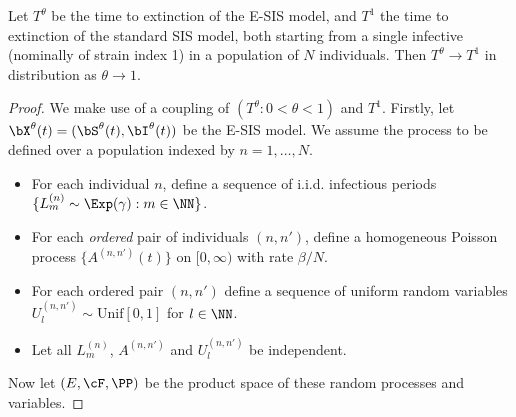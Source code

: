 \documentclass[review]{elsarticle}
\begin{document}
\begin{mythm}\label{thm: tt 1}
	Let $T^{\theta}$ be the time to extinction of the E-SIS model, and $T^1$ the time to extinction of the standard SIS model, both starting from a single infective (nominally of strain index 1) in a population of $N$ individuals. Then $T^{\theta} \rightarrow T^1$ in distribution as $\theta \rightarrow 1$.
\end{mythm}
\begin{proof}
		We make use of a coupling of $(T^{\theta}: 0 <\theta < 1)$ and $T^1$. 
	 Firstly, let $\bX^\theta(t) = (\bS^\theta(t), \bI^\theta(t))$ be the E-SIS model.
	We assume the process to be defined over a population indexed by $n=1, \dots, N$.
	\begin{itemize}
		\item For each individual $n$, define a sequence of i.i.d. infectious periods $\{ L^{(n)}_m \sim \Exp (\gamma): m \in \NN \}$. 
		\item For each \emph{ordered} pair of individuals $(n, n')$, define a homogeneous Poisson process $\{A^{(n,n')}(t)\}$ on $[0,\infty)$ with rate $\beta/N$. 
		\item For each ordered pair $(n, n')$ define a sequence of uniform random variables $U^{(n,n')}_l \sim \text{Unif}[0,1]$ for $l \in \NN$. 
		\item Let all $L^{(n)}_m$, $A^{(n,n')}$ and $U_l^{(n,n')}$ be independent.
	\end{itemize}
	Now let $(E, \cF, \PP)$ be the product space of these random processes and variables.

\end{proof}
\end{document}

